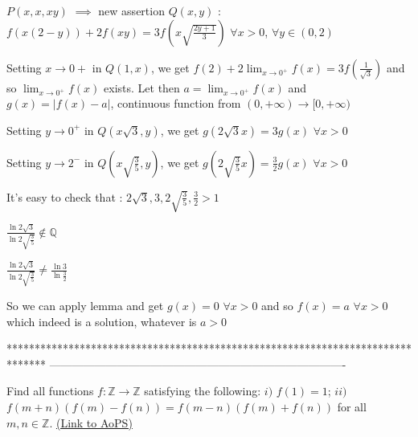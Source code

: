 \begin{solution}
$P(x,x,xy)$ $\implies$ new assertion $Q(x,y)$ : $f(x(2-y))+2f(xy)=3f(x\sqrt{\frac{2y+1}3})$ $\forall x>0$, $\forall y\in (0,2)$

Setting $x\to 0+$ in $Q(1,x)$, we get $f(2)+2\lim_{x\to 0^+}f(x)=3f(\frac 1{\sqrt 3})$ and so $\lim_{x\to 0^+}f(x)$ exists.
Let then $a=\lim_{x\to 0^+}f(x)$ and $g(x)=|f(x)-a|$, continuous function from $(0,+\infty)\to[0,+\infty)$

Setting $y\to 0^+$ in $Q(x\sqrt 3,y)$, we get $g(2\sqrt 3x)=3g(x)$ $\forall x>0$

Setting $y\to 2^-$ in $Q(x\sqrt{\frac 35},y)$, we get $g(2\sqrt{\frac 35}x)=\frac 32g(x)$ $\forall x>0$

It's easy to check that :
$2\sqrt 3,3,2\sqrt{\frac 35},\frac 32 >1$

$\frac{\ln 2\sqrt 3}{\ln 2\sqrt{\frac 35}}\notin\mathbb Q$

$\frac{\ln 2\sqrt 3}{\ln 2\sqrt{\frac 35}}\ne \frac{\ln 3}{\ln\frac 32}$

So we can apply lemma and get $g(x)=0$ $\forall x>0$ and so $\boxed{f(x)=a}$ $\forall x>0$ which indeed is a solution, whatever is $a>0$
\end{solution}
*******************************************************************************
-------------------------------------------------------------------------------

\begin{problem}
	Find all functions $f:\mathbb{Z}\rightarrow \mathbb{Z}$ satisfying the following:
$i)$ $f(1)=1$;
$ii)$ $f(m+n)(f(m)-f(n))=f(m-n)(f(m)+f(n))$ for all $m,n \in \mathbb{Z}$.
	\flushright \href{https://artofproblemsolving.com/community/c6h478497}{(Link to AoPS)}
\end{problem}




